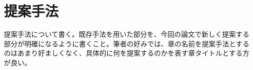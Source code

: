 \chapter{提案手法}
\label{chap:method}

提案手法について書く。既存手法を用いた部分を、今回の論文で新しく提案する部分が明確になるように書くこと。筆者の好みでは、章の名前を提案手法とするのはあまり好ましくなく、具体的に何を提案するのかを表す章タイトルとする方が良い。
